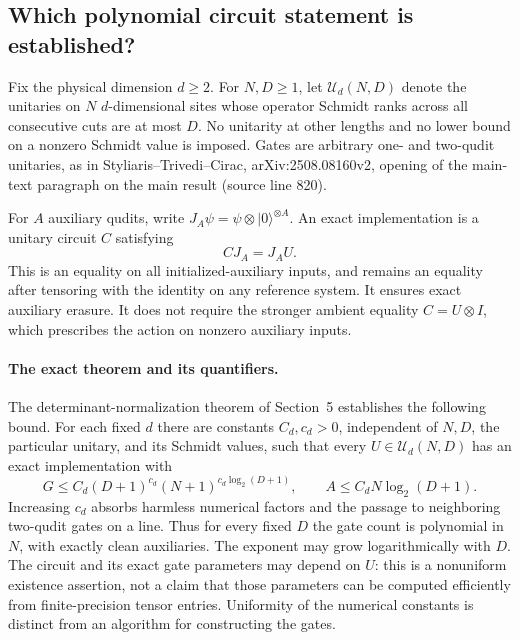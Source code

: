 \documentclass[11pt]{article}
\begin{document}
\subsection*{Which polynomial circuit statement is established?}

Fix the physical dimension $d\ge2$. For $N,D\ge1$, let
$\mathcal U_d(N,D)$ denote the unitaries on $N$ $d$-dimensional sites
whose operator Schmidt ranks across all consecutive cuts are at most
$D$. No unitarity at other lengths and no lower bound on a nonzero
Schmidt value is imposed. Gates are arbitrary one- and two-qudit
unitaries, as in Styliaris--Trivedi--Cirac, arXiv:2508.08160v2, opening of the
main-text paragraph on the main result (source line 820).

For $A$ auxiliary qudits, write
$J_A\psi=\psi\otimes|0\rangle^{\otimes A}$.
An exact implementation is a unitary circuit $C$ satisfying
\[
 C J_A=J_AU.
\]
This is an equality on all initialized-auxiliary inputs, and remains an
equality after tensoring with the identity on any reference system.
It ensures exact auxiliary erasure. It does not require the stronger
ambient equality $C=U\otimes I$, which prescribes the action on
nonzero auxiliary inputs.

\paragraph{The exact theorem and its quantifiers.}
The determinant-normalization theorem of Section~5 establishes the
following bound. For each fixed $d$ there are constants $C_d,c_d>0$,
independent of $N,D$, the particular unitary, and its Schmidt values,
such that every $U\in\mathcal U_d(N,D)$ has an exact implementation with
\[
 G\le C_d(D+1)^{c_d}
             (N+1)^{c_d\log_2(D+1)},\qquad
 A\le C_d N\log_2(D+1).
\]
Increasing $c_d$ absorbs harmless numerical factors and the passage
to neighboring two-qudit gates on a line. Thus for every fixed $D$
the gate count is polynomial in $N$, with exactly clean auxiliaries.
The exponent may grow logarithmically with $D$.
The circuit and its exact gate parameters may depend on $U$:
this is a nonuniform existence assertion, not a claim that those
parameters can be computed efficiently from finite-precision tensor
entries. Uniformity of the numerical constants is distinct from an
algorithm for constructing the gates.
\end{document}
